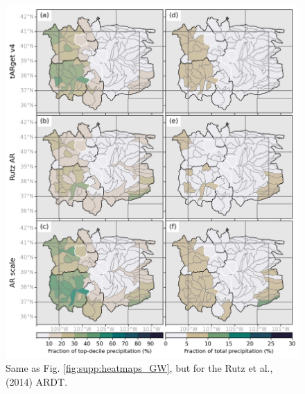 \documentclass[jgrga]{agutexSI2019}
\begin{document}
\begin{article}
\begin{figure}
\noindent\includegraphics[scale=0.8]{figS12.png}
\caption{Same as Fig. \ref{fig:supp:heatmaps_GW}, but for the Rutz et al., (2014) ARDT.}
\label{fig:supp:heatmaps_rutz}
\end{figure}
\clearpage


\end{article}
\end{document}
